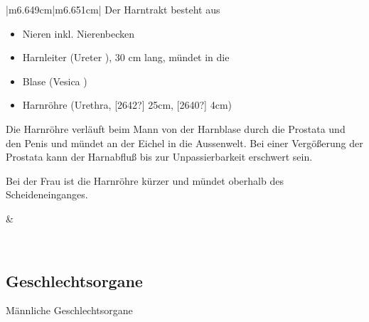 \documentclass{article}
\makeatletter
\newcommand\captionof[1]{\def\@captype{#1}\caption}
\makeatother
\begin{document}
\begin{center}
\tablehead{}\begin{supertabular}{|m{6.649cm}|m{6.651cm}|}
\hline
Der Harntrakt besteht aus 

\begin{itemize}
\item Nieren inkl. Nierenbecken

\item {}Harnleiter  (Ureter ), 30 cm lang, m\"undet  in
die

\item {}Blase  (Vesica )

\item Harnr\"ohre  (Urethra, [2642?] 25cm, [2640?] 4cm)

\end{itemize}
Die Harnr\"ohre verl\"auft beim Mann von der Harnblase durch die
Prostata und den Penis und m\"undet an der Eichel in die Aussenwelt.
Bei einer Verg\"o{\ss}erung der Prostata kann der Harnabflu{\ss} bis
zur Unpassierbarkeit erschwert sein.  

Bei der Frau ist die Harnr\"ohre k\"urzer und m\"undet oberhalb des
Scheideneinganges. 

 &
 \par

\captionof{figure}{Harntrakt mit Nieren (linke Niere im Querschnitt mit
Nierenbescken), Harnleiter, Blase und Harnr\"ohre. Auf den Nieren sieht
man wie eine Zipfelm\"utze die Nebennieren.}
\label{seq:refIllustration4}
\\\hline
\end{supertabular}
\end{center}
\subsection{Geschlechtsorgane}
M\"annliche Geschlechtsorgane
\end{document}
